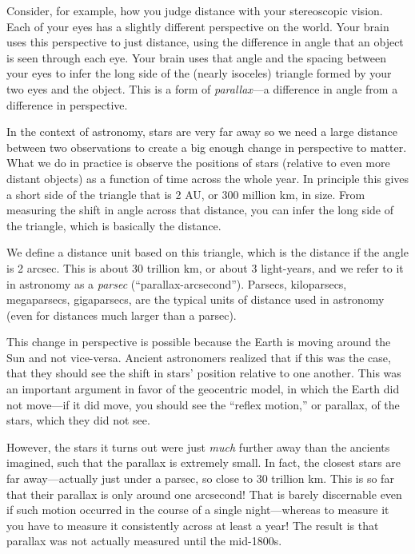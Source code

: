 \documentclass[12pt, preprint]{aastex}
\begin{document}
Consider, for example, how you judge distance with your stereoscopic
vision. Each of your eyes has a slightly different perspective on the
world. Your brain uses this perspective to just distance, using the
difference in angle that an object is seen through each eye. Your
brain uses that angle and the spacing between your eyes to infer the
long side of the (nearly isoceles) triangle formed by your two eyes
and the object. This is a form of {\it parallax}---a difference in
angle from a difference in perspective.

In the context of astronomy, stars are very far away so we need a
large distance between two observations to create a big enough change
in perspective to matter. What we do in practice is observe the
positions of stars (relative to even more distant objects) as a
function of time across the whole year. In principle this gives a
short side of the triangle that is 2 AU, or 300 million km, in size.
From measuring the shift in angle across that distance, you can infer
the long side of the triangle, which is basically the distance.

We define a distance unit based on this triangle, which is the
distance if the angle is 2 arcsec. This is about 30 trillion km, or
about 3 light-years, and we refer to it in astronomy as a {\it parsec}
(``parallax-arcsecond''). Parsecs, kiloparsecs, megaparsecs,
gigaparsecs, are the typical units of distance used in astronomy (even
for distances much larger than a parsec).

This change in perspective is possible because the Earth is moving
around the Sun and not vice-versa. Ancient astronomers realized that
if this was the case, that they should see the shift in stars'
position relative to one another. This was an important argument in
favor of the geocentric model, in which the Earth did not move---if it
did move, you should see the ``reflex motion,'' or parallax, of the
stars, which they did not see.

However, the stars it turns out were just {\it much} further away than
the ancients imagined, such that the parallax is extremely small. In
fact, the closest stars are far away---actually just under a parsec,
so close to 30 trillion km. This is so far that their parallax is only
around one arcsecond! That is barely discernable even if such motion
occurred in the course of a single night---whereas to measure it you
have to measure it consistently across at least a year!  The result is
that parallax was not actually measured until the mid-1800s.
\end{document}
